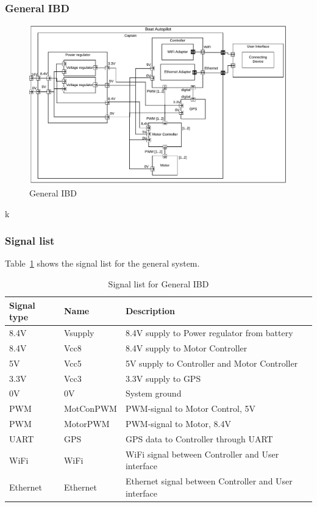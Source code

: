 \subsubsection{General IBD}
\begin{figure}[H]
	\centering
	\includegraphics[width=1\linewidth]{Images/System_architecture/General_IBD}
	\caption{General IBD}
\end{figure}

k

\subsubsection{Signal list}

Table~\ref*{table: General IBD} shows the signal list for the general system.
\begin{table}[htbp]
	\centering
	\begin{tabular}{|l|l|l|}
		\hline
		\textbf{Signal type} 	&\textbf{Name}		&\textbf{Description} \\\hline
		8.4V			&Vsupply	&8.4V supply to Power regulator from battery\\\hline
		
		8.4V			&Vcc8		&8.4V supply to Motor Controller\\\hline
		5V			&Vcc5		&5V supply to Controller and Motor Controller\\\hline
		3.3V			&Vcc3		&3.3V supply to GPS\\\hline
		0V			&0V			&System ground\\\hline
		PWM	&MotConPWM	&PWM-signal to Motor Control, 5V\\\hline
		PWM	&MotorPWM	&PWM-signal to Motor, 8.4V\\\hline
		UART		&GPS		&GPS data to Controller through UART\\\hline	
		WiFi		&WiFi		&WiFi signal between Controller and User interface\\\hline
		Ethernet	&Ethernet	&Ethernet signal between Controller and User interface\\\hline
		
		
	\end{tabular}
	\caption{Signal list for General IBD}
	\label{table: General IBD}
\end{table}

